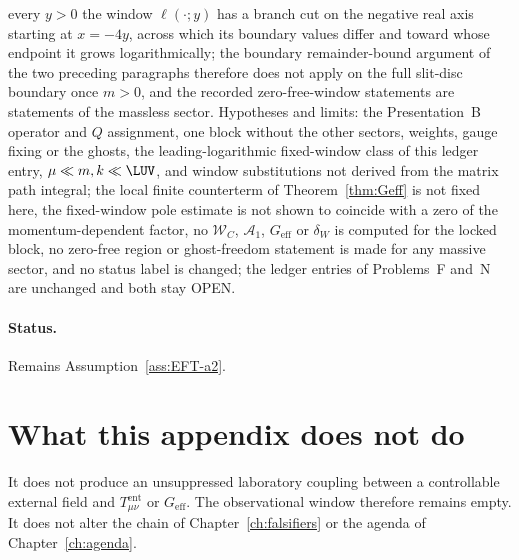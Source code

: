 every \(y>0\) the window \(\ell(\cdot;y)\) has a branch cut on the
negative real axis starting at \(x=-4y\), across which its boundary
values differ and toward whose endpoint it grows logarithmically;
the boundary remainder-bound argument of the two preceding paragraphs
therefore does not apply on the full slit-disc boundary once
\(m>0\), and the recorded zero-free-window statements are statements
of the massless sector. Hypotheses and limits: the Presentation~B
operator and \(Q\) assignment, one block without the other sectors,
weights, gauge fixing or the ghosts, the leading-logarithmic
fixed-window class of this ledger entry, \(\mu\ll m,k\ll\LUV\), and
window substitutions not derived from the matrix path integral; the
local finite counterterm of Theorem~\ref{thm:Geff} is not fixed here,
the fixed-window pole estimate is not shown to coincide with a zero
of the momentum-dependent factor, no \(\mathcal W_C\),
\(\mathcal A_1\), \(G_{\mathrm{eff}}\) or \(\delta_W\) is computed
for the locked block, no zero-free region or ghost-freedom statement
is made for any massive sector, and no status label is changed; the
ledger entries of Problems~F and~N are unchanged and both stay OPEN.

\paragraph{Status.}
Remains Assumption~\ref{ass:EFT-a2}.

\section{What this appendix does not do}
\label{sec:status-not}

It does not produce an unsuppressed laboratory coupling between a
controllable external field and \(T_{\mu\nu}^{\mathrm{ent}}\) or
\(G_{\mathrm{eff}}\). The observational window therefore remains empty.
It does not alter the chain of Chapter~\ref{ch:falsifiers} or the agenda of
Chapter~\ref{ch:agenda}.
